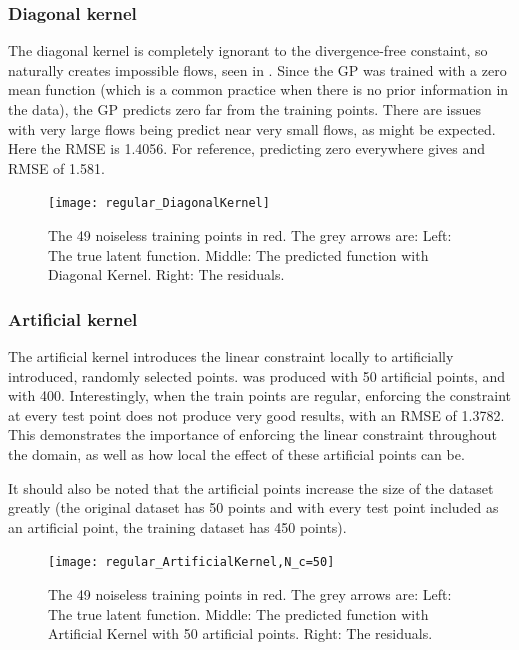 \documentclass[12pt,a4paper,twoside]{report}
\theoremstyle{definition}
\begin{document}
\subsubsection{Diagonal kernel}
The diagonal kernel is completely ignorant to the divergence-free constaint, so naturally creates impossible flows, seen in . Since the GP was trained with a zero mean function (which is a common practice when there is no prior information in the data), the GP predicts zero far from the training points. There are issues with very large flows being predict near very small flows, as might be expected. Here the RMSE is 1.4056. For reference, predicting zero everywhere gives and RMSE of 1.581.

\begin{figure}[ht]
	\centering
	\texttt{[image: regular\_DiagonalKernel]}
	\caption[Diagonal kernel, regular training points]{The 49 noiseless training points in red. The grey arrows are: Left: The true latent function. Middle: The predicted function with Diagonal Kernel. Right: The residuals.}
	\label{regdiag}
\end{figure}

\subsubsection{Artificial kernel}
The artificial kernel introduces the linear constraint locally to artificially introduced, randomly selected points.  was produced with 50 artificial points, and  with 400. Interestingly, when the train points are regular, enforcing the constraint at every test point does not produce very good results, with an RMSE of 1.3782. This demonstrates the importance of enforcing the linear constraint throughout the domain, as well as how local the effect of these artificial points can be.

It should also be noted that the artificial points increase the size of the dataset greatly (the original dataset has 50 points and with every test point included as an artificial point, the training dataset has 450 points).

\begin{figure}[ht]
	\centering
	\texttt{[image: regular\_ArtificialKernel,N\_c=50]}
	\caption[Artificial kernel (50 inducing points), regular training points]{The 49 noiseless training points in red. The grey arrows are: Left: The true latent function. Middle: The predicted function with Artificial Kernel with 50 artificial points. Right: The residuals.}
	\label{regartif50}
\end{figure}
\end{document}
